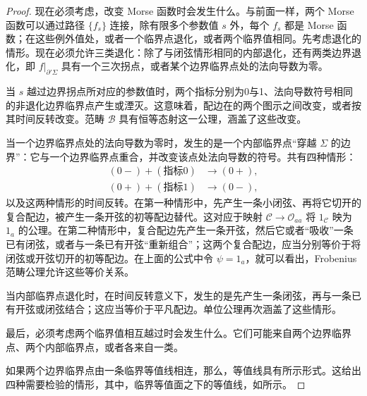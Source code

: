 \begin{proof}
现在必须考虑，改变 Morse 函数时会发生什么。与前面一样，两个 Morse 函数可以通过路径 $\{f_s\}$ 连接，除有限多个参数值 $s$ 外，每个 $f_s$ 都是 Morse 函数；在这些例外值处，或者一个临界点退化，或者两个临界值相同。先考虑退化的情形。现在必须允许三类退化：除了与闭弦情形相同的内部退化，还有两类边界退化，即 $f|_{\partial'\Sigma}$ 具有一个三次拐点，或者某个边界临界点处的法向导数为零。

\begin{figure}[H]
\centering
{}
\BookNumberOnlyCaption\label{fig:2.37}
\end{figure}

当 $s$ 越过边界拐点所对应的参数值时，两个指标分别为0与1、法向导数符号相同的非退化边界临界点产生或湮灭。这意味着，配边在的两个图示之间改变，或者按其时间反转改变。范畴 $\mathcal{B}$ 具有恒等态射这一公理，涵盖了这些改变。

当一个边界临界点处的法向导数为零时，发生的是一个内部临界点“穿越 $\Sigma$ 的边界”：它与一个边界临界点重合，并改变该点处法向导数的符号。共有四种情形：
\[
\begin{aligned}
(0-)+(\text{指标0})&\longrightarrow(0+),\\
(0+)+(\text{指标1})&\longrightarrow(0-),
\end{aligned}
\]
以及这两种情形的时间反转。在第一种情形中，先产生一条小闭弦、再将它切开的复合配边，被产生一条开弦的初等配边替代。这对应于映射 $\mathcal{C}\to\mathcal{O}_{aa}$ 将 $1_{\mathcal{C}}$ 映为 $1_a$ 的公理。在第二种情形中，复合配边先产生一条开弦，然后它或者“吸收”一条已有闭弦，或者与一条已有开弦“重新组合”；这两个复合配边，应当分别等价于将闭弦或开弦切开的初等配边。在上面的公式中令 $\psi=1_a$，就可以看出，Frobenius 范畴公理允许这些等价关系。

当内部临界点退化时，在时间反转意义下，发生的是先产生一条闭弦，再与一条已有开弦或闭弦结合；这应当等价于平凡配边。单位公理再次涵盖了这些情形。

最后，必须考虑两个临界值相互越过时会发生什么。它们可能来自两个边界临界点、两个内部临界点，或者各来自一类。

如果两个边界临界点由一条临界等值线相连，那么，等值线具有所示形式。这给出四种需要检验的情形，其中，临界等值面之下的等值线，如所示。


\end{proof}
